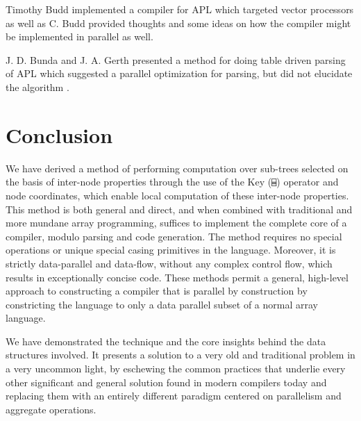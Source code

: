 \documentclass[numbers,9pt]{sigplanconf}
\begin{document}
Timothy Budd implemented a compiler \cite{budd1984apl,budd2012apl} for APL which targeted
vector processors as well as C. Budd provided 
thoughts and some ideas on how the compiler might be implemented in
parallel as well.

J. D. Bunda and J. A. Gerth presented a method for doing table driven
parsing of APL which suggested a parallel optimization for parsing,
but did not elucidate the algorithm \cite{bunda1984apl}.

\section{Conclusion}

We have derived a method of performing computation over sub-trees
selected on the basis of inter-node properties through the use of the
Key (\verb;⌸;) operator and node coordinates, which enable local computation
of these inter-node properties. This method is both general and direct,
and when combined with traditional and more mundane array programming,
suffices to implement the complete core of a compiler, modulo parsing
and code generation. The method requires no special operations or
unique special casing primitives in the language. Moreover, it is
strictly data-parallel and data-flow, without any complex control flow,
which results in exceptionally concise code. These methods permit a 
general, high-level approach to constructing a compiler that is 
parallel by construction by constricting the language to only a data parallel 
subset of a normal array language. 

We have demonstrated the technique and the core insights behind the
data structures involved. It presents a solution to a very old and
traditional problem in a very uncommon light, by eschewing the common
practices that underlie every other significant and general solution
found in modern compilers today and replacing them with an entirely
different paradigm centered on parallelism and aggregate operations.
\balancecolumns



\end{document}
